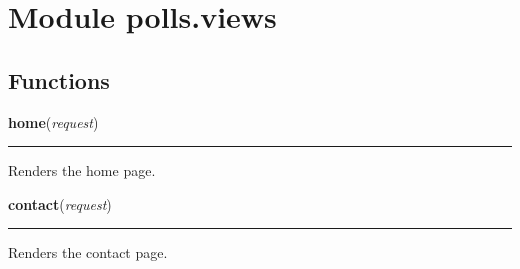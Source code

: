%
%
%


\section{Module polls.views}

    \label{polls:views}


  \subsection{Functions}

    \label{polls:views:home}

    \vspace{0.5ex}

\hspace{.8\funcindent}\begin{boxedminipage}{\funcwidth}

    \raggedright \textbf{home}(\textit{request})

    \vspace{-1.5ex}

    \rule{\textwidth}{0.5\fboxrule}
\setlength{\parskip}{2ex}
    Renders the home page.

\setlength{\parskip}{1ex}
    \end{boxedminipage}

    \label{polls:views:contact}

    \vspace{0.5ex}

\hspace{.8\funcindent}\begin{boxedminipage}{\funcwidth}

    \raggedright \textbf{contact}(\textit{request})

    \vspace{-1.5ex}

    \rule{\textwidth}{0.5\fboxrule}
\setlength{\parskip}{2ex}
    Renders the contact page.

\setlength{\parskip}{1ex}
    \end{boxedminipage}

